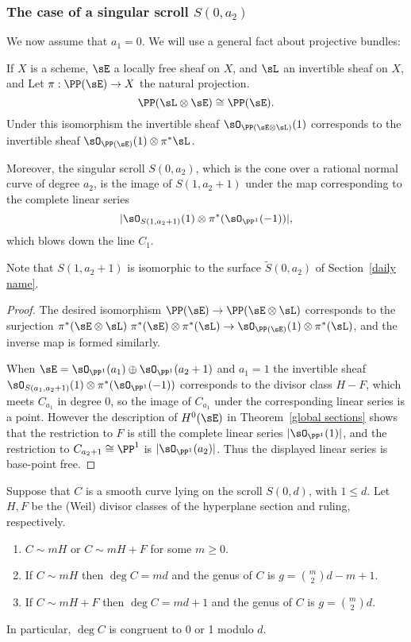 \subsubsection{The case of a singular scroll $S(0,a_{2})$}


We now assume that $a_{1} = 0$. We will use a general fact about projective bundles:

\begin{proposition}\label{singular scrolls}
If $X$ is a scheme, $\sE$ a locally free sheaf on $X$, and $\sL$ an invertible sheaf on $X$, 
and Let $\pi: \PP(\sE)\to X$ the natural projection.
$$
\PP(\sL \otimes \sE)\cong \PP(\sE).
$$
Under this isomorphism the invertible sheaf $\sO_{\PP(\sE\otimes \sL)}(1)$ corresponds to the invertible sheaf
$\sO_{\PP(\sE)}(1)\otimes \pi^{*}\sL$. 

Moreover, the singular scroll $S(0,a_{2})$, which is the cone over a rational normal curve of degree $a_{2}$, is the image of
$S(1, a_{2}+1)$ under the map corresponding to the complete linear series 
$$
|\sO_{S(1, a_{2}+1)}(1) \otimes \pi^{*}(\sO_{\PP^{1}}(-1))|,
$$
which blows down the line $C_{1}$.
\end{proposition}

Note that $S(1,a_2+1)$ is isomorphic to the surface $\tilde S(0, a_2)$ of Section~\ref{daily name}.

\begin{proof} 
The desired isomorphism $\PP(\sE) \to \PP(\sE\otimes \sL)$ corresponds to the surjection 
$\pi^*(\sE \otimes\sL) \ \pi^*(\sE) \otimes \pi^*(\sL) \to \sO_{\PP(\sE)}(1) \otimes \pi^*(\sL)$, 
and the inverse map is formed similarly.

When $\sE = \sO_{\PP^1}(a_1)\oplus \sO_{\PP^1}(a_2+1)$ and $a_1 = 1$ the
invertible sheaf
$\sO_{S(a_1, a_{2}+1)}(1) \otimes \pi^{*}(\sO_{\PP^{1}}(-1))$ corresponds to the divisor class $H-F$, which meets $C_{a_1}$  in degree 0, so the image
of $C_{a_1}$ under the corresponding linear series is a point. However the description of  $H^0(\sE)$ in
Theorem~\ref{global sections} shows that the restriction to $F$
is still the complete linear series $|\sO_{\PP^1}(1)|$, and the restriction to $C_{{a_2}+1}\cong \PP^1$
is $|\sO_{\PP^1}(a_2)|$. Thus the displayed linear series is base-point free.
\end{proof}

\begin{theorem}\label{curves on a singular scroll}
 Suppose that $C$ is a smooth curve lying on the scroll $S(0,d)$, with $1\leq d$. Let $H,F$ be the (Weil) divisor classes of the hyperplane section and ruling, respectively.
\begin{enumerate}
\item $C\sim mH$ or $C\sim mH+F$ for some $m\geq 0$.
\item If $C\sim mH$ then $\deg C = md$ and the genus of $C$ is $g = \binom{m}{2}d-m+1$.
\item If $C\sim mH+F$ then $\deg C = md+1$ and the genus of $C$ is $g = \binom{m}{2}d$.
\end{enumerate}
In particular, $\deg C$ is congruent to 0 or 1 modulo $d$.
\end{theorem}

